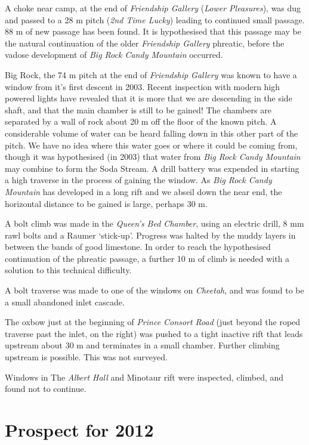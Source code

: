 A choke near camp, at the end of \emph{Friendship Gallery} (\emph{Lower
Pleasures}), was dug and passed to a 28 m pitch (\emph{2nd Time Lucky})
leading to continued small passage. 88 m of new passage has been found.
It is hypothesised that this passage may be the natural continuation of
the older \emph{Friendship Gallery} phreatic, before the vadose
development of \emph{Big Rock Candy Mountain} occurred.

Big Rock, the 74 m pitch at the end of \emph{Friendship Gallery} was
known to have a window from it's first descent in 2003. Recent
inspection with modern high powered lights have revealed that it is more
that we are descending in the side shaft, and that the main chamber is
still to be gained! The chambers are separated by a wall of rock about
20 m off the floor of the known pitch. A considerable volume of water
can be heard falling down in this other part of the pitch. We have no
idea where this water goes or where it could be coming from, though it
was hypothesised (in 2003) that water from \emph{Big Rock Candy
Mountain} may combine to form the Soda Stream. A drill battery was
expended in starting a high traverse in the process of gaining the
window. As \emph{Big Rock Candy Mountain} has developed in a long rift
and we abseil down the near end, the horizontal distance to be gained is
large, perhaps 30 m.

A bolt climb was made in the \emph{Queen's Bed Chamber}, using an
electric drill, 8 mm rawl bolts and a Raumer `stick-up'. Progress was
halted by the muddy layers in between the bands of good limestone. In
order to reach the hypothesised continuation of the phreatic passage, a
further 10 m of climb is needed with a solution to this technical
difficulty.

A bolt traverse was made to one of the windows on \emph{Cheetah}, and
was found to be a small abandoned inlet cascade.

The oxbow just at the beginning of \emph{Prince Consort Road} (just
beyond the roped traverse past the inlet, on the right) was pushed to a
tight inactive rift that leads upstream about 30 m and terminates in a
small chamber. Further climbing upstream is possible. This was not
surveyed.

Windows in The \emph{Albert Hall} and Minotaur rift were inspected,
climbed, and found not to continue.

\hypertarget{prospect-for-2012}{%
\section{Prospect for 2012}\label{prospect-for-2012}}

